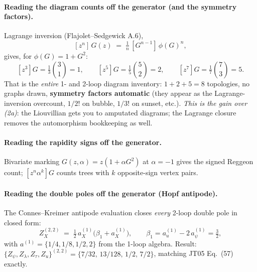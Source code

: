 \documentclass[11pt,a4paper]{article}
\begin{document}
\paragraph{Reading the diagram counts off the generator (and the symmetry factors).} Lagrange inversion (Flajolet--Sedgewick A.6),
\[
  [z^n]\,G(z) \;=\; \tfrac{1}{n}\,[G^{n-1}]\,\phi(G)^n,
\]
gives, for $\phi(G)=1+G^2$:
\[
  [z^3]G = \tfrac{1}{3}\binom{3}{1} = 1,\qquad
  [z^5]G = \tfrac{1}{5}\binom{5}{2} = 2,\qquad
  [z^7]G = \tfrac{1}{7}\binom{7}{3} = 5.
\]
That is the \emph{entire} 1- and 2-loop diagram inventory: $1+2+5 = 8$ topologies, no graphs drawn, \textbf{symmetry factors automatic} (they appear as the Lagrange-inversion overcount, $1/2!$ on bubble, $1/3!$ on sunset, etc.). \emph{This is the gain over (2a)}: the Liouvillian gets you to amputated diagrams; the Lagrange closure removes the automorphism bookkeeping as well.

\paragraph{Reading the rapidity signs off the generator.} Bivariate marking
$G(z,\alpha) = z(1+\alpha G^2)$ at $\alpha=-1$ gives the signed Reggeon count; $[z^n\alpha^k]G$ counts trees with $k$ opposite-sign vertex pairs.

\paragraph{Reading the double poles off the generator (Hopf antipode).} The Connes--Kreimer antipode evaluation closes \emph{every} 2-loop double pole in closed form:
\[
  Z_X^{(2,2)} \;=\; \tfrac12\,a_X^{(1)}\bigl(\beta_1 + a_X^{(1)}\bigr),
  \qquad \beta_1 = a_u^{(1)} - 2\,a_\psi^{(1)} = \tfrac32,
\]
with $a^{(1)} = \{1/4, 1/8, 1/2, 2\}$ from the 1-loop algebra. Result: $\{Z_\psi, Z_\lambda, Z_\tau, Z_u\}^{(2,2)} = \{7/32,\,13/128,\,1/2,\,7/2\}$, matching JT05 Eq.~(57) exactly.
\end{document}
